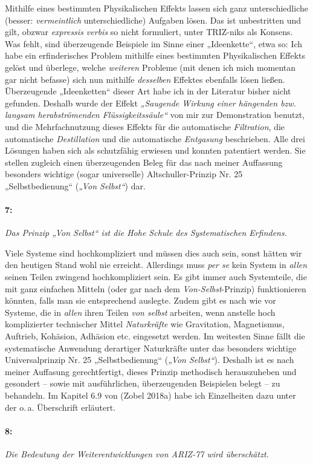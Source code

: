 \documentclass[12pt,a4paper]{article}
\newcommand{\these}[2]{\paragraph{#1:} \emph{#2}\par}
\begin{document}
Mithilfe eines bestimmten Physikalischen Effekts lassen sich ganz
unterschiedliche (besser: \emph{vermeintlich} unterschiedliche) Aufgaben
lösen.  Das ist unbestritten und gilt, obzwar \emph{expressis verbis} so nicht
formuliert, unter TRIZ-niks als Konsens. Was fehlt, sind überzeugende
Beispiele im Sinne einer „Ideenkette“, etwa so: Ich habe ein erfinderisches
Problem mithilfe eines bestimmten Physikalischen Effekts gelöst und überlege,
welche \emph{weiteren} Probleme (mit denen ich mich momentan gar nicht
befasse) sich nun mithilfe \emph{desselben} Effektes ebenfalls lösen ließen.
Überzeugende „Ideenketten“ dieser Art habe ich in der Literatur bisher nicht
gefunden. Deshalb wurde der Effekt \emph{„Saugende Wirkung einer hängenden
  bzw. langsam herabströmenden Flüssigkeitssäule“} von mir zur Demonstration
benutzt, und die Mehrfachnutzung dieses Effekts für die automatische
\emph{Filtration}, die automatische \emph{Destillation} und die automatische
\emph{Entgasung} beschrieben. Alle drei Lösungen haben sich als schutzfähig
erwiesen und konnten patentiert werden. Sie stellen zugleich einen
überzeugenden Beleg für das nach meiner Auffassung besonders wichtige (sogar
universelle) Altschuller-Prinzip Nr. 25 „Selbstbedienung“ (\emph{„Von
  Selbst“}) dar.

\these{7}{Das Prinzip „Von Selbst“ ist die Hohe Schule des Systematischen
  Erfindens.}

Viele Systeme sind hochkompliziert und müssen dies auch sein, sonst hätten wir
den heutigen Stand wohl nie erreicht. Allerdings muss \emph{per se} kein
System in \emph{allen} seinen Teilen zwingend hochkompliziert sein. Es gibt
immer auch Systemteile, die mit ganz einfachen Mitteln (oder gar nach dem
\emph{Von-Selbst}-Prinzip) funktionieren könnten, falls man sie entsprechend
auslegte. Zudem gibt es nach wie vor Systeme, die in \emph{allen} ihren Teilen
\emph{von selbst} arbeiten, wenn anstelle hoch komplizierter technischer
Mittel \emph{Naturkräfte} wie Gravitation, Magnetismus, Auftrieb, Kohäsion,
Adhäsion etc. eingesetzt werden. Im weitesten Sinne fällt die systematische
Anwendung derartiger Naturkräfte unter das besonders wichtige Universalprinzip
Nr. 25 „Selbstbedienung“ (\emph{„Von Selbst“}). Deshalb ist es nach meiner
Auffasung gerechtfertigt, dieses Prinzip methodisch herauszuheben und
gesondert – sowie mit ausführlichen, überzeugenden Beispielen belegt – zu
behandeln. Im Kapitel 6.9 von (Zobel 2018a) habe ich Einzelheiten dazu unter
der o.\,a. Überschrift erläutert.
\clearpage

\these{8}{Die Bedeutung der Weiterentwicklungen von ARIZ-77 wird überschätzt.}
\end{document}
